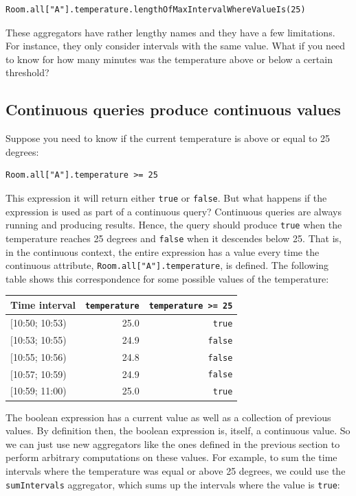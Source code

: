 \documentclass{report}
\begin{document}
\begin{verbatim}
Room.all["A"].temperature.lengthOfMaxIntervalWhereValueIs(25)
\end{verbatim}

These aggregators have rather lengthy names and they have a few
limitations. For instance, they only consider intervals with the same
value. What if you need to know for how many minutes was the
temperature above or below a certain threshold?

\subsection{Continuous queries produce continuous values}

Suppose you need to know if the current temperature is above or equal
to 25 degrees:

\begin{verbatim}
Room.all["A"].temperature >= 25
\end{verbatim}

This expression it will return either \verb=true= or \verb=false=. But
what happens if the expression is used as part of a continuous query?
Continuous queries are always running and producing results. Hence,
the query should produce \verb=true= when the temperature reaches 25
degrees and \verb=false= when it descendes below 25. That is, in the
continuous context, the entire expression has a value every time the
continuous attribute, \verb=Room.all["A"].temperature=, is
defined. The following table shows this correspondence for some
possible values of the temperature:

\begin{tabular}{ |l|r|r| }
  \hline
  Time interval & \verb=temperature= & \verb!temperature >= 25! \\
  \hline
  $[$10:50; 10:53) & 25.0 & \verb=true=  \\
  $[$10:53; 10:55) & 24.9 & \verb=false= \\
  $[$10:55; 10:56) & 24.8 & \verb=false= \\
  $[$10:57; 10:59) & 24.9 & \verb=false= \\
  $[$10:59; 11:00) & 25.0 & \verb=true=  \\
  \hline
\end{tabular}

The boolean expression has a current value as well as a collection of
previous values. By definition then, the boolean expression is,
itself, a continuous value. So we can just use new aggregators like
the ones defined in the previous section to perform arbitrary
computations on these values. For example, to sum the time intervals
where the temperature was equal or above 25 degrees, we could use the
\verb=sumIntervals= aggregator, which sums up the intervals where the
value is \verb=true=:
\end{document}

